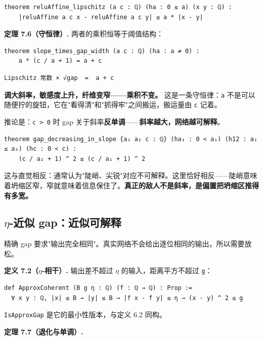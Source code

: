 \documentclass[11pt,a4paper]{ctexart}
\begin{document}
\begin{lstlisting}
theorem reluAffine_lipschitz (a c : ℚ) (ha : 0 ≤ a) (x y : ℚ) :
    |reluAffine a c x - reluAffine a c y| ≤ a * |x - y|
\end{lstlisting}

\textbf{定理 7.6（守恒律）.} 两者的乘积恒等于阈值结构：

\begin{lstlisting}
theorem slope_times_gap_width (a c : ℚ) (ha : a ≠ 0) :
    a * (c / a + 1) = a + c
\end{lstlisting}

\begin{lstlisting}
Lipschitz 常数 × √gap  =  a + c
\end{lstlisting}

\textbf{调大斜率，敏感度上升，纤维变窄——乘积不变。} 这是一条守恒律：\texttt{a} 不是可以随便拧的旋钮，它在"看得清"和"抓得牢"之间搬运，搬运量由 \texttt{c} 记着。

推论是：\texttt{c > 0} 时 gap 关于斜率\textbf{反单调}——\textbf{斜率越大，网络越可解释}。

\begin{lstlisting}
theorem gap_decreasing_in_slope {a₁ a₂ c : ℚ} (ha₁ : 0 < a₁) (h12 : a₁ ≤ a₂) (hc : 0 < c) :
    (c / a₂ + 1) ^ 2 ≤ (c / a₁ + 1) ^ 2
\end{lstlisting}

这与直觉相反：通常认为"陡峭、尖锐"对应不可解释。这里恰好相反——陡峭意味着坍缩区窄，窄就意味着信息保住了。\textbf{真正的敌人不是斜率，是偏置把坍缩区推得有多宽。}

\subsection{\ensuremath{\eta}-近似 gap：近似可解释}

精确 gap 要求"输出完全相同"。真实网络不会给出逐位相同的输出，所以需要放松。

\textbf{定义 7.2（\ensuremath{\eta}-相干）.} 输出差不超过 \texttt{\ensuremath{\eta}} 的输入，距离平方不超过 \texttt{g}：

\begin{lstlisting}
def ApproxCoherent (B g η : ℚ) (f : ℚ → ℚ) : Prop :=
  ∀ x y : ℚ, |x| ≤ B → |y| ≤ B → |f x - f y| ≤ η → (x - y) ^ 2 ≤ g
\end{lstlisting}

\texttt{IsApproxGap} 是它的最小性版本，与定义 6.2 同构。

\textbf{定理 7.7（退化与单调）.}
\end{document}
